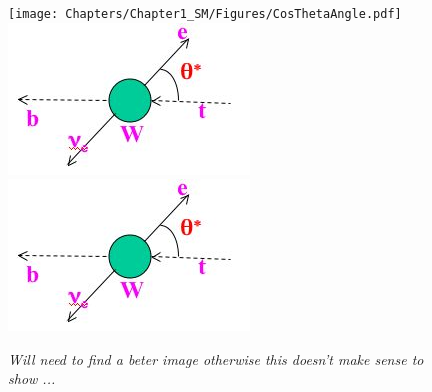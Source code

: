 \begin{figure}[h!t]
 \centering
 \texttt{[image: Chapters/Chapter1\_SM/Figures/CosThetaAngle.pdf]}
 \includegraphics[width = 0.4 \textwidth]{Chapters/Chapter1_SM/Figures/image_cos_theta_cartoon.jpg}
 \includegraphics[width = 0.4 \textwidth]{Chapters/Chapter1_SM/Figures/CosThetaImage.png}
 \caption{\textit{Will need to find a beter image otherwise this doesn't make sense to show ...}}
\end{figure}


